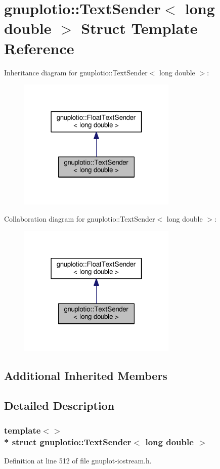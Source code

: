 \hypertarget{structgnuplotio_1_1_text_sender_3_01long_01double_01_4}{}\section{gnuplotio\+:\+:Text\+Sender$<$ long double $>$ Struct Template Reference}
\label{structgnuplotio_1_1_text_sender_3_01long_01double_01_4}


Inheritance diagram for gnuplotio\+:\+:Text\+Sender$<$ long double $>$\+:\nopagebreak
\begin{figure}[H]
\begin{center}
\leavevmode
\includegraphics[width=214pt]{structgnuplotio_1_1_text_sender_3_01long_01double_01_4__inherit__graph}
\end{center}
\end{figure}


Collaboration diagram for gnuplotio\+:\+:Text\+Sender$<$ long double $>$\+:\nopagebreak
\begin{figure}[H]
\begin{center}
\leavevmode
\includegraphics[width=214pt]{structgnuplotio_1_1_text_sender_3_01long_01double_01_4__coll__graph}
\end{center}
\end{figure}
\subsection*{Additional Inherited Members}


\subsection{Detailed Description}
\subsubsection*{template$<$$>$\\*
struct gnuplotio\+::\+Text\+Sender$<$ long double $>$}



Definition at line 512 of file gnuplot-\/iostream.\+h.

